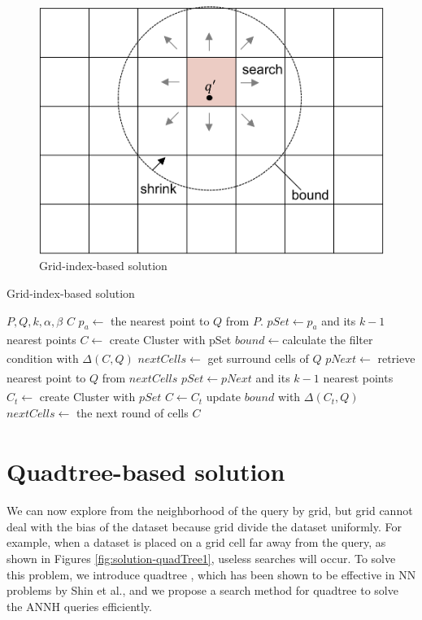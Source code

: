 \documentclass[a4paper,11pt]{report}
\theoremstyle{mytheoremstyle}
\begin{document}
\begin{figure}
\includegraphics[width=\textwidth]{images/solution-grid.pdf}
\caption{Grid-index-based solution} \label{fig:solution-grid}
\end{figure}


\begin{algorithm}                      
\caption{Grid-index-based solution}         
\label{alg:grid}
\begin{algorithmic}[1]                  
\renewcommand{\algorithmicrequire}{\textbf{Input:}}
\renewcommand{\algorithmicensure}{\textbf{Output:}}
\REQUIRE $P,Q,k,\alpha, \beta$
\ENSURE $C$
\STATE $p_a \xleftarrow[]{}$ the nearest point to $Q$ from $P$.
\STATE $pSet \xleftarrow{} p_a$ and its $k-1$ nearest points
\STATE $C \xleftarrow[]{}$ create Cluster with pSet
\STATE $bound \xleftarrow[]{} $calculate the filter condition with $\Delta(C,Q)$
\STATE $nextCells \xleftarrow[]{} $ get surround cells of $Q$
\STATE $pNext \xleftarrow[]{}$ retrieve nearest point to $Q$ from $nextCells$
\STATE $pSet \xleftarrow[]{} pNext$ and its $k-1$ nearest points
\STATE $C_t \xleftarrow{}$ create Cluster with $pSet$
\STATE $C \xleftarrow{} C_t$
\STATE update $bound$ with $\Delta(C_t,Q)$
\ENDIF
\STATE $nextCells \xleftarrow[]{} $ the next round of cells
\ENDWHILE
\RETURN $C$
\end{algorithmic}
\end{algorithm}

\section{Quadtree-based solution}
We can now explore from the neighborhood of the query by grid, but grid cannot deal with the bias of the dataset because grid divide the dataset uniformly. For example, when a dataset is placed on a grid cell far away from the query, as shown in Figures \ref{fig:solution-quadTree1}, useless searches will occur. To solve this problem, we introduce quadtree \cite{finkel1974quad}, which has been shown to be effective in NN problems by Shin et al.\cite{shin2019investigation}, and we propose a search method for quadtree to solve the ANNH queries efficiently.
\end{document}
